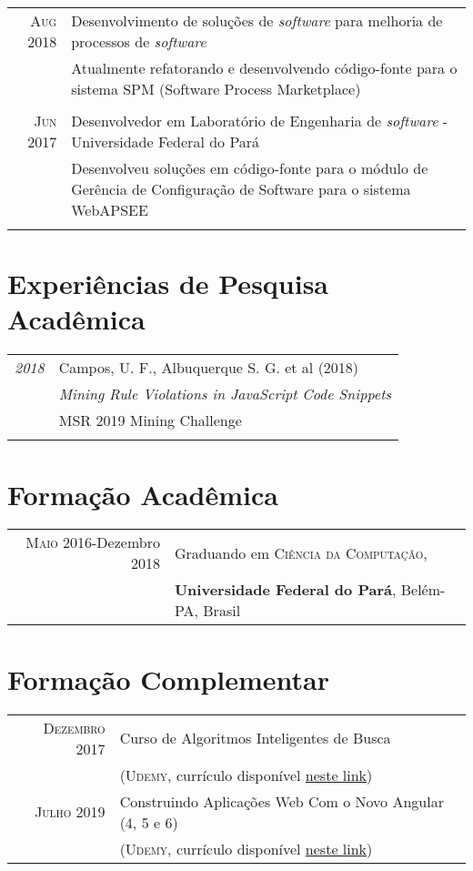 \documentclass[a4paper,10pt]{article}
\begin{document}
\begin{tabular}{r|p{11cm}}
 \textsc{Aug 2018} & Desenvolvimento de soluções de \textit{software} para melhoria de processos de \textit{software}\\& \footnotesize{Atualmente refatorando e desenvolvendo código-fonte para o sistema SPM (Software Process Marketplace)}\\\\
 \textsc{Jun 2017} & Desenvolvedor em Laboratório de Engenharia de \textit{software} - Universidade Federal do Pará \\ & \footnotesize{Desenvolveu soluções em código-fonte para o módulo de Gerência de Configuração de Software para o sistema WebAPSEE}\\\multicolumn{2}{c}{} \\
\end{tabular}

\section{Experiências de Pesquisa Acadêmica}
\begin{tabular}{r|p{11cm}}
 \emph{2018} & Campos, U. F., Albuquerque S. G. et al (2018)\\
 & \textit{Mining Rule Violations in JavaScript Code Snippets}\\
 & MSR 2019 Mining Challenge\\\multicolumn{2}{c}{} \\
\end{tabular}

\section{Formação Acadêmica}
\begin{tabular}{rl}	
 \textsc{Maio} 2016-Dezembro 2018 & Graduando em \textsc{Ciência da Computação}, \\
& \textbf{Universidade Federal do Pará}, Belém-PA, Brasil
\end{tabular}

\section{Formação Complementar}
\begin{tabular}{rl}
\textsc{Dezembro} 2017 & Curso de Algoritmos Inteligentes de Busca\\ & (\textsc{Udemy}, \footnotesize{currículo disponível \href{https://www.udemy.com/certificate/UC-9414I0UR/}{neste link}})\\
\textsc{Julho} 2019 &  Construindo Aplicações Web Com o Novo Angular (4, 5 e 6)\\ & (\textsc{Udemy}, \footnotesize{currículo disponível \href{https://www.udemy.com/certificate/UC-P6VGWTET/}{neste link}})
\end{tabular}
\end{document}
